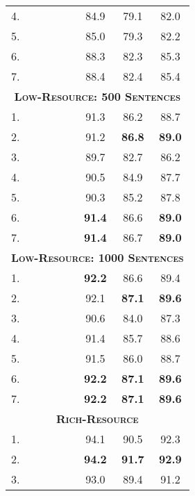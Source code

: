 \documentclass[11pt,a4paper]{article}
\newcommand{\cmark}{\textcolor{blue}{\ding{51}}}
\newcommand{\xmark}{\textcolor{red}{\ding{55}}}
\begin{document}
\begin{table}[]
\begin{tabular}{l|cccc||cc|c}
4. & \cmark & \xmark & \cmark & \xmark & 84.9 & 79.1 & 82.0 \\
5. & \cmark & \xmark & \cmark & \cmark & 85.0 & 79.3 & 82.2 \\
6. & \cmark & \cmark & \cmark & \xmark & 88.3 & 82.3 & 85.3 \\
7. & \cmark & \cmark & \cmark & \cmark & 88.4 & 82.4 & 85.4 \\
\hline\hline
\multicolumn{8}{c}{\bf \textsc{Low-Resource: 500 Sentences}}\\
\hline
1. & \xmark & \cmark & \xmark & \xmark & 91.3 & 86.2 & 88.7 \\
2. & \xmark & \cmark & \cmark & \xmark & 91.2 & \textbf{86.8} & \textbf{89.0} \\
3. & \cmark & \xmark & \xmark & \xmark & 89.7 & 82.7 & 86.2 \\
4. & \cmark & \xmark & \cmark & \xmark & 90.5 & 84.9 & 87.7 \\
5. & \cmark & \xmark & \cmark & \cmark & 90.3 & 85.2 & 87.8 \\
6. & \cmark & \cmark & \cmark & \xmark & \textbf{91.4} & 86.6 & \textbf{89.0} \\
7. & \cmark & \cmark & \cmark & \cmark & \textbf{91.4} & 86.7 & \textbf{89.0} \\
\hline\hline
\multicolumn{8}{c}{\bf \textsc{Low-Resource: 1000 Sentences}}\\
\hline
1. & \xmark & \cmark & \xmark & \xmark & \textbf{92.2} & 86.6 & 89.4 \\
2. & \xmark & \cmark & \cmark & \xmark & 92.1 & \textbf{87.1} & \textbf{89.6} \\
3. & \cmark & \xmark & \xmark & \xmark & 90.6 & 84.0 & 87.3 \\
4. & \cmark & \xmark & \cmark & \xmark & 91.4 & 85.7 & 88.6 \\
5. & \cmark & \xmark & \cmark & \cmark & 91.5 & 86.0 & 88.7 \\
6. & \cmark & \cmark & \cmark & \xmark & \textbf{92.2} & \textbf{87.1} & \textbf{89.6} \\
7. & \cmark & \cmark & \cmark & \cmark & \textbf{92.2} & \textbf{87.1} & \textbf{89.6} \\
\hline\hline
\multicolumn{8}{c}{\bf \textsc{Rich-Resource}}\\
\hline
1. & \xmark & \cmark & \xmark & \xmark & 94.1 & 90.5 & 92.3 \\
2. & \xmark & \cmark & \cmark & \xmark & \textbf{94.2} & \textbf{91.7} & \textbf{92.9} \\
3. & \cmark & \xmark & \xmark & \xmark & 93.0 & 89.4 & 91.2 \\

\end{tabular}
\end{table}
\end{document}
